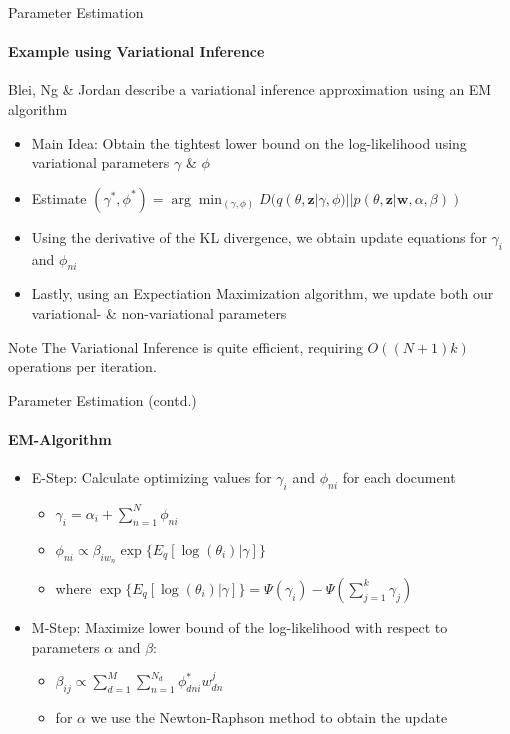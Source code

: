 \documentclass[aspectratio=169]{beamer}
\begin{document}
\begin{frame}{Parameter Estimation}
  \framesubtitle{Example using Variational Inference}

  Blei, Ng \& Jordan \cite{LDA} describe a variational inference approximation using an EM algorithm
  \begin{itemize}
    \item Main Idea: Obtain the tightest lower bound on the log-likelihood using variational parameters $\gamma$ \& $\phi$
    \item Estimate $(\gamma^*, \phi^* ) =\arg \min_{(\gamma, \phi)} D(q(\theta , \textbf{z} | \gamma, \phi) || p(\theta, \textbf{z} | \textbf{w}, \alpha, \beta)) $
    \item Using the derivative of the KL divergence, we obtain update equations for $\gamma_i$ and $\phi_{ni}$
    \item Lastly, using an Expectiation Maximization algorithm, we update both our variational- \& non-variational parameters
  \end{itemize}
  
  \begin{exampleblock}{Note}
    The Variational Inference is quite efficient, requiring $O((N + 1)k)$ operations per iteration.
  \end{exampleblock}
\end{frame}

\begin{frame}{Parameter Estimation (contd.)}
\framesubtitle{EM-Algorithm}
  \begin{itemize}
    \item E-Step: Calculate optimizing values for $\gamma_i$ and $\phi_{ni}$ for each document
    \begin{itemize}
      \item $\gamma_i = \alpha_i + \sum_{n=1}^N \phi_{ni}$
      \item $\phi_{ni} \propto \beta_{iw_n} \exp\{E_q[\log(\theta_i) |\gamma]\}$
      \item where $\exp\{E_q[\log(\theta_i) |\gamma]\} = \Psi(\gamma_i) - \Psi \left(\sum_{j=1}^k \gamma_j\right)$
    \end{itemize}
    \item M-Step: Maximize lower bound of the log-likelihood with respect to parameters $\alpha$ and $\beta$:
    \begin{itemize}
      \item $\beta_{ij} \propto \sum^{M}_{d=1}\sum^{N_d}_{n=1} \phi^*_{dni} w^{j}_{dn} $
      \item for $\alpha$ we use the Newton-Raphson method to obtain the update
    \end{itemize}
  \end{itemize}
  
\end{frame} 
\end{document}
